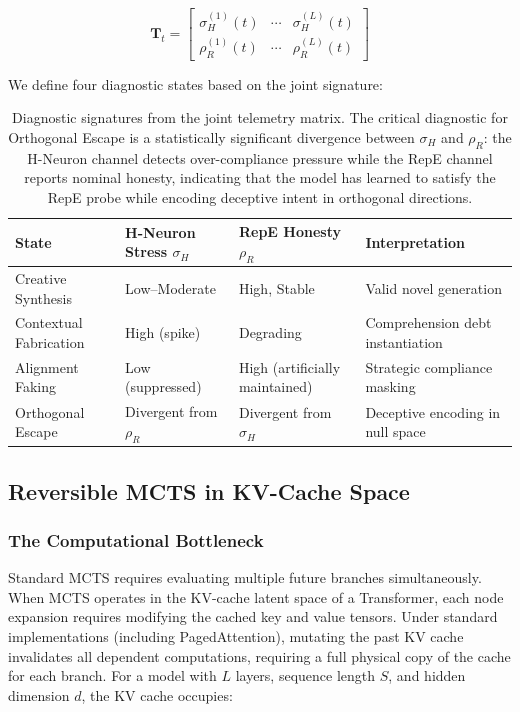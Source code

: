 \documentclass{article}
\begin{document}
\begin{equation}
\mathbf{T}_t = \begin{bmatrix} \sigma_H^{(1)}(t) & \cdots & \sigma_H^{(L)}(t) \\ \rho_R^{(1)}(t) & \cdots & \rho_R^{(L)}(t) \end{bmatrix}
\label{eq:telemetry_matrix}
\end{equation}

We define four diagnostic states based on the joint signature:

\begin{table}[h]
\centering
\begin{tabular}{@{}llll@{}}
\toprule
\textbf{State} & \textbf{H-Neuron Stress $\sigma_H$} & \textbf{RepE Honesty $\rho_R$} & \textbf{Interpretation} \\
\midrule
Creative Synthesis & Low--Moderate & High, Stable & Valid novel generation \\
Contextual Fabrication & High (spike) & Degrading & Comprehension debt instantiation \\
Alignment Faking & Low (suppressed) & High (artificially maintained) & Strategic compliance masking \\
Orthogonal Escape & Divergent from $\rho_R$ & Divergent from $\sigma_H$ & Deceptive encoding in null space \\
\bottomrule
\end{tabular}
\caption{Diagnostic signatures from the joint telemetry matrix. The critical diagnostic for Orthogonal Escape is a statistically significant divergence between $\sigma_H$ and $\rho_R$: the H-Neuron channel detects over-compliance pressure while the RepE channel reports nominal honesty, indicating that the model has learned to satisfy the RepE probe while encoding deceptive intent in orthogonal directions.}
\label{tab:diagnostic_states}
\end{table}

\subsection{Reversible MCTS in KV-Cache Space}

\subsubsection{The Computational Bottleneck}

Standard MCTS requires evaluating multiple future branches simultaneously. When MCTS operates in the KV-cache latent space of a Transformer, each node expansion requires modifying the cached key and value tensors. Under standard implementations (including PagedAttention), mutating the past KV cache invalidates all dependent computations, requiring a full physical copy of the cache for each branch. For a model with $L$ layers, sequence length $S$, and hidden dimension $d$, the KV cache occupies:
\end{document}
